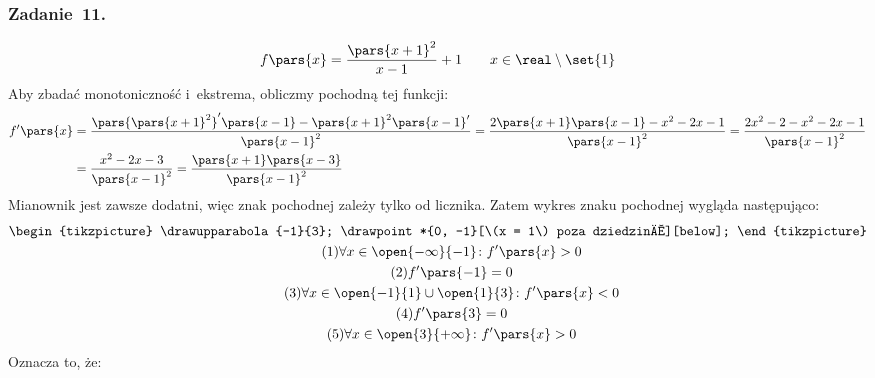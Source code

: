 \subsubsection*{Zadanie~11.}
\begin{equation*}
    f\pars{x}
        = \frac{\pars{x + 1}^2}{x - 1} + 1 \qquad x \in \real \setminus \set{1}
\end{equation*}
Aby zbadać monotoniczność i~ekstrema, obliczmy pochodną tej funkcji:
\begin{equation*}
    \begin{split}
        f'\pars{x}
            &= \frac{\pars{\pars{x + 1}^2}'\pars{x - 1} - \pars{x + 1}^2\pars{x - 1}'}{\pars{x - 1}^2}
            = \frac{2\pars{x + 1}\pars{x - 1} - x^2 - 2x - 1}{\pars{x - 1}^2}
            = \frac{2x^2 - 2 - x^2 - 2x - 1}{\pars{x - 1}^2}\\
            &= \frac{x^2 - 2x - 3}{\pars{x - 1}^2}
            = \frac{\pars{x + 1}\pars{x - 3}}{\pars{x - 1}^2}
    \end{split}
\end{equation*}
Mianownik jest zawsze dodatni, więc znak pochodnej zależy tylko od licznika. Zatem wykres znaku pochodnej wygląda następująco:
\begin{gather*}
    \begin{tikzpicture}
        \drawupparabola{-1}{3};
        \drawpoint*{0, -1}[\(x = 1\) poza dziedziną][below];
    \end{tikzpicture}\\
    \tag{\(1\)} \forall x \in \open{-\infty}{-1}\colon f'\pars{x} > 0 \label{2020_11_09:11:first_increase}\\
    \tag{\(2\)} f'\pars{-1} = 0 \label{2020_11_09:11:first_zero}\\
    \tag{\(3\)} \forall x \in \open{-1}{1} \cup \open{1}{3}\colon f'\pars{x} < 0 \label{2020_11_09:11:decrease}\\
    \tag{\(4\)} f'\pars{3} = 0 \label{2020_11_09:11:second_zero}\\
    \tag{\(5\)} \forall x \in \open{3}{+\infty}\colon f'\pars{x} > 0 \label{2020_11_09:11:second_increase}
\end{gather*}
Oznacza to, że:
